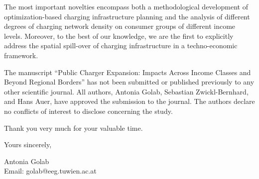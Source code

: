 \documentclass[10.5pt]{letter}
\begin{document}
\begin{letter}{}
The most important novelties encompass both a methodological development of optimization-based charging infrastructure planning and the analysis of different degrees of charging network density on consumer groups of different income levels. Moreover, to the best of our knowledge, we are the first to explicitly address the spatial spill-over of charging infrastructure in a techno-economic framework.

The manuscript ``Public Charger Expansion: Impacts Across Income Classes and Beyond Regional Borders'' has not been submitted or published previously to any other scientific journal. All authors, Antonia Golab, Sebastian Zwickl-Bernhard, and Hans Auer, have approved the submission to the journal. The authors declare no conflicts of interest to disclose concerning the study.

Thank you very much for your valuable time.

\closing{Yours sincerely,}

\vspace{0.5cm}

Antonia Golab\\
Email: golab@eeg.tuwien.ac.at \\

\end{letter}
\end{document}

